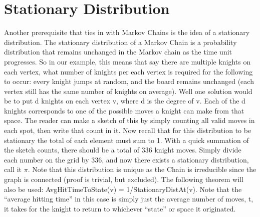 \documentclass{article}
\begin{document}
\section*{Stationary Distribution}
\indent \indent Another prerequisite that ties in with Markov Chains is the idea of a stationary distribution.  The stationary distribution of a Markov Chain is a probability distribution that remains unchanged in the Markov chain as the time unit progresses.  So in our example, this means that say there are multiple knights on each vertex, what number of knights per each vertex is required for the following to occur: every knight jumps at random, and the board remains unchanged (each vertex still has the same number of knights on average).  Well one solution would be to put d knights on each vertex v, where d is the degree of v.  Each of the d knights corresponds to one of the possible moves a knight can make from that space.  The reader can make a sketch of this by simply counting all valid moves in each spot, then write that count in it.  Now recall that for this distribution to be stationary the total of each element must sum to 1.  With a quick summation of the sketch counts, there should be a total of 336 knight moves.  Simply divide each number on the grid by 336, and now there exists a stationary distribution, call it $\pi$.  Note that this distribution is unique as the Chain is irreducible since the graph is connected (proof is trivial, but excluded).  The following theorem will also be used: AvgHitTimeToState(v) = 1/StationaryDistAt(v).  Note that the “average hitting time” in this case is simply just the average number of moves, t,  it takes for the knight to return to whichever “state” or space it originated.
\end{document}
